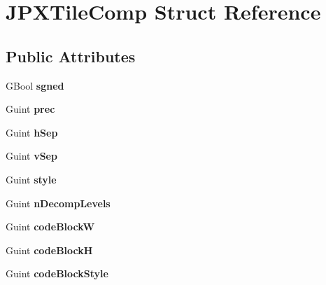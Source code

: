 \hypertarget{struct_j_p_x_tile_comp}{}\section{J\+P\+X\+Tile\+Comp Struct Reference}
\label{struct_j_p_x_tile_comp}
\subsection*{Public Attributes}
\begin{DoxyCompactItemize}
\item 
\mbox{\label{struct_j_p_x_tile_comp_a49a489bfbd1cf694f27c1c6d06557729}} 
G\+Bool {\bfseries sgned}
\item 
\mbox{\label{struct_j_p_x_tile_comp_a54450db12cac12021acbf0ad132dbb16}} 
Guint {\bfseries prec}
\item 
\mbox{\label{struct_j_p_x_tile_comp_a21e7ea1c7e5dc749b9ad722eb8048109}} 
Guint {\bfseries h\+Sep}
\item 
\mbox{\label{struct_j_p_x_tile_comp_a7c2eab380efaaa9b4954d0bfdc34fe92}} 
Guint {\bfseries v\+Sep}
\item 
\mbox{\label{struct_j_p_x_tile_comp_a6d750cdb3e060288af7e166269a31b55}} 
Guint {\bfseries style}
\item 
\mbox{\label{struct_j_p_x_tile_comp_a06c501d832a3d4a5aa07515a4fd0a3bf}} 
Guint {\bfseries n\+Decomp\+Levels}
\item 
\mbox{\label{struct_j_p_x_tile_comp_a672aaeeeeae90dc015d80373b25d98cb}} 
Guint {\bfseries code\+BlockW}
\item 
\mbox{\label{struct_j_p_x_tile_comp_a8a43cfeb7d4dc3b81e628023458ff95a}} 
Guint {\bfseries code\+BlockH}
\item 
\mbox{\label{struct_j_p_x_tile_comp_a30c2c793cdb535dd0e54201c27a4428a}} 
Guint {\bfseries code\+Block\+Style}
\item 
\mbox{\label{struct_j_p_x_tile_comp_a977d88802f0499cab54dd5eb5a3ba71c}} 

\end{DoxyCompactItemize}
